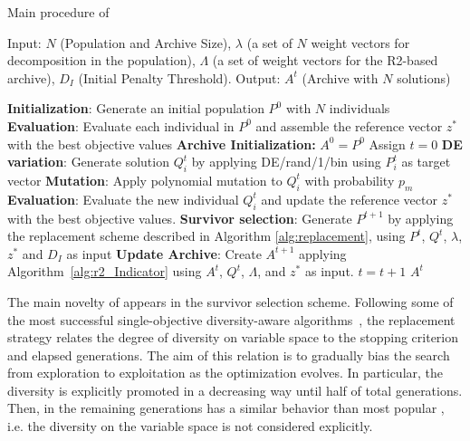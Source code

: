 \begin{algorithm}[!t]
        \caption{Main procedure of \AVSDMOEAD{}}
        \begin{small}
\begin{algorithmic}[1]
				\STATE Input: $N$ (Population and Archive Size), $\lambda$ (a set of $N$ weight vectors for decomposition in the population),
				$\Lambda$ (a set of weight vectors for the R2-based archive), $D_I$ (Initial Penalty Threshold).
        \STATE Output: $A^{t}$ (Archive with $N$ solutions)

        \STATE \textbf{Initialization}: Generate an initial population $P^0$ with $N$ individuals \label{alg_1:1}
        \STATE \textbf{Evaluation}: Evaluate each individual in $P^0$ and assemble the reference vector $z^*$ with the best objective values \label{alg_1:3}
				\STATE \textbf{Archive Initialization:} $A^0 = P^0$
        \STATE Assign $t=0$ \label{alg_1:4}
         \label{alg_1:5}
            \label{alg_1:6}
               \STATE \textbf{DE variation}: Generate solution $Q^t_{i}$ by applying DE/rand/1/bin using $P_{i}^t$ as target vector \label{alg_1:8}
							 \STATE \textbf{Mutation}: Apply polynomial mutation to $Q^t_{i}$ with probability $p_m$
               \STATE \textbf{Evaluation}: Evaluate the new individual $Q^t_{i}$ and update the reference vector $z^*$ with the best objective values. \label{alg_1:9}
           \ENDFOR \label{alg_1:10}
           \STATE \textbf{Survivor selection}: Generate $P^{t+1}$ by applying the replacement scheme described in  Algorithm \ref{alg:replacement}, using $P^t$, $Q^t$, $\lambda$, $z^*$ and $D_I$ as input \label{alg_1:11}
	   \STATE \textbf{Update Archive}: Create $A^{t+1}$ applying Algorithm~\ref{alg:r2_Indicator} using $A^{t}$, $Q^t$, $\Lambda$, and $z^*$ as input. \label{alg_1:11bis}
           \STATE $t=t+1$ \label{alg_1:12}
        \ENDWHILE \label{alg_1:13}
        \RETURN $A^{t}$ 
        \end{algorithmic}
        \end{small}
\label{alg:vsd-moead}
\end{algorithm}


The main novelty of \AVSDMOEAD{} appears in the  survivor selection scheme.
%
Following some of the most successful single-objective diversity-aware algorithms~\cite{segura2016improving}, the 
replacement strategy relates the degree of diversity on variable space to the stopping criterion
and elapsed generations.
%
The aim of this relation is to gradually bias the search from exploration to exploitation as the
optimization evolves.
%
In particular, the diversity is explicitly promoted in a decreasing way until half of total generations. 
%
Then, in the remaining generations \AVSDMOEAD{} has a similar behavior than most popular
\MOEAS{}, i.e. the diversity on the variable space is not considered explicitly.

